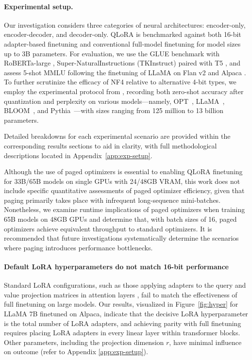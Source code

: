 \paragraph{Experimental setup.} Our investigation considers three categories of neural architectures: encoder-only, encoder-decoder, and decoder-only. QLoRA is benchmarked against both 16-bit adapter-based finetuning and conventional full-model finetuning for model sizes up to 3B parameters. For evaluation, we use the GLUE benchmark \citep{wang2018glue} with RoBERTa-large \citep{liu2019roberta}, Super-NaturalInstructions (TKInstruct) \citep{wang2022super} paired with T5 \citep{t5}, and assess 5-shot MMLU \citep{hendrycksmeasuring} following the finetuning of LLaMA on Flan v2 \citep{longpre2023flan} and Alpaca \citep{alpaca}. To further scrutinize the efficacy of NF4 relative to alternative 4-bit types, we employ the experimental protocol from \citet{dettmers2022case}, recording both zero-shot accuracy after quantization and perplexity on various models—namely, OPT~\citep{zhang2022opt}, LLaMA~\citep{touvron2023llama}, BLOOM~\citep{scao2022bloom}, and Pythia~\citep{biderman2023pythia}—with sizes ranging from 125 million to 13 billion parameters.

Detailed breakdowns for each experimental scenario are provided within the corresponding results sections to aid in clarity, with full methodological descriptions located in Appendix~\ref{app:exp-setup}.

Although the use of paged optimizers is essential to enabling \textsc{QLoRA} finetuning for 33B/65B models on single GPUs with 24/48GB VRAM, this work does not include specific quantitative assessments of paged optimizer efficiency, given that paging primarily takes place with infrequent long-sequence mini-batches. Nonetheless, we examine runtime implications of paged optimizers when training 65B models on 48GB GPUs and determine that, with batch sizes of 16, paged optimizers achieve equivalent throughput to standard optimizers. It is recommended that future investigations systematically determine the scenarios where paging introduces performance bottlenecks.

\paragraph{Default LoRA hyperparameters do not match 16-bit performance}

Standard LoRA configurations, such as those applying adapters to the query and value projection matrices in attention layers \citep{hu2021lora}, fail to match the effectiveness of full finetuning on large models. Our results, visualized in Figure~\ref{fig:hyper} for LLaMA 7B finetuned on Alpaca, indicate that the decisive LoRA hyperparameter is the total number of LoRA adapters, and achieving parity with full finetuning requires placing LoRA adapters in every linear layer within transformer blocks. Other parameters, including the projection dimension $r$, have minimal influence on outcome (refer to Appendix \ref{app:exp-setup}).

